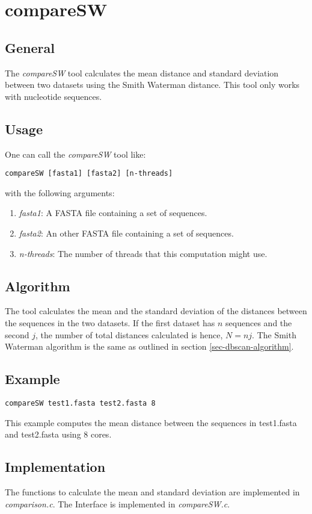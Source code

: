 \section{compareSW}

\subsection{General}

The \emph{compareSW} tool calculates the mean distance and standard deviation
between two datasets using the Smith Waterman distance. This tool only
works with nucleotide sequences.

\subsection{Usage}

One can call the \emph{compareSW} tool like:
\begin{lstlisting}
compareSW [fasta1] [fasta2] [n-threads]
\end{lstlisting}
with the following arguments:
\begin{enumerate}
\item \emph{fasta1}: A FASTA file containing a set of sequences.
\item \emph{fasta2}: An other FASTA file containing a set of sequences.
\item \emph{n-threads}: The number of threads that this computation might use.
\end{enumerate}

\subsection{Algorithm}

The tool calculates the mean and the standard deviation of the distances
between the sequences in the two datasets. If the first dataset has
$n$ sequences and the second $j$, the number of total distances
calculated is hence, $N=nj$. The Smith Waterman algorithm is the same
as outlined in section \ref{sec-dbscan-algorithm}. 

\subsection{Example}
\begin{lstlisting}
compareSW test1.fasta test2.fasta 8
\end{lstlisting}
This example computes the mean distance between the sequences in test1.fasta
and test2.fasta using 8 cores. 

\subsection{Implementation}
The functions to calculate the mean and standard deviation are
implemented in \emph{comparison.c}. The Interface is implemented in
\emph{compareSW.c}.
